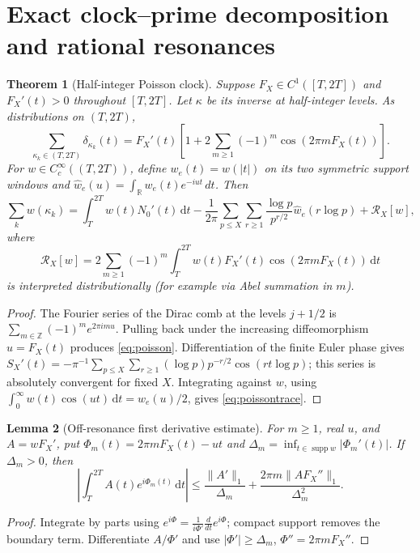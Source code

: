 \documentclass[11pt,a4paper]{article}
\numberwithin{equation}{section}
\newtheorem{theorem}{Theorem}[section]
\newtheorem{lemma}[theorem]{Lemma}
\newcommand{\R}{\mathbb R}
\newcommand{\dd}{\,\mathrm d}
\newcommand{\supp}{\operatorname{supp}}
\begin{document}
\section{Exact clock--prime decomposition and rational resonances}
\begin{theorem}[Half-integer Poisson clock]\label{thm:poisson}
Suppose $F_X\in C^1([T,2T])$ and $F_X'(t)>0$ throughout $[T,2T]$. Let $\kappa$ be its inverse at half-integer levels. As distributions on $(T,2T)$,
\begin{equation}\label{eq:poisson}
\sum_{\kappa_k\in(T,2T)}\delta_{\kappa_k}(t)
=F_X'(t)\left[1+2\sum_{m\ge1}(-1)^m\cos(2\pi mF_X(t))\right].
\end{equation}
For $w\in C_c^\infty((T,2T))$, define $w_e(t)=w(|t|)$ on its two symmetric support windows and $\widehat w_e(u)=\int_\R w_e(t)e^{-iut}\,dt$. Then
\begin{equation}\label{eq:poissontrace}
\sum_k w(\kappa_k)=\int_T^{2T}w(t)N_0'(t)\dd t
-\frac1{2\pi}\sum_{p\le X}\sum_{r\ge1}\frac{\log p}{p^{r/2}}\widehat w_e(r\log p)
+\mathcal R_X[w],
\end{equation}
where
\begin{equation}\label{eq:remainder}
\mathcal R_X[w]=2\sum_{m\ge1}(-1)^m\int_T^{2T}w(t)F_X'(t)\cos(2\pi mF_X(t))\dd t
\end{equation}
is interpreted distributionally (for example via Abel summation in $m$).
\end{theorem}
\begin{proof}
The Fourier series of the Dirac comb at the levels $j+1/2$ is $\sum_{m\in\mathbb Z}(-1)^m e^{2\pi i m u}$. Pulling back under the increasing diffeomorphism $u=F_X(t)$ produces \eqref{eq:poisson}. Differentiation of the finite Euler phase gives
$S_X'(t)=-\pi^{-1}\sum_{p\le X}\sum_{r\ge1}(\log p)p^{-r/2}\cos(rt\log p)$;
this series is absolutely convergent for fixed $X$. Integrating against $w$, using $\int_0^\infty w(t)\cos(ut)\dd t=\widehat w_e(u)/2$, gives \eqref{eq:poissontrace}.
\end{proof}
\begin{lemma}[Off-resonance first derivative estimate]\label{lem:ibp}
For $m\ge1$, real $u$, and $A=wF_X'$, put
$\Phi_m(t)=2\pi mF_X(t)-ut$ and
$\Delta_m=\inf_{t\in\supp w}|\Phi_m'(t)|$. If $\Delta_m>0$, then
\begin{equation}\label{eq:ibp}
\left|\int_T^{2T} A(t)e^{i\Phi_m(t)}\dd t\right|
\le\frac{\|A'\|_1}{\Delta_m}
+\frac{2\pi m\|AF_X''\|_1}{\Delta_m^2}.
\end{equation}
\end{lemma}
\begin{proof}
Integrate by parts using $e^{i\Phi}=\frac1{i\Phi'}\frac{d}{dt}e^{i\Phi}$; compact support removes the boundary term. Differentiate $A/\Phi'$ and use $|\Phi'|\ge\Delta_m$, $\Phi''=2\pi mF_X''$.
\end{proof}
\end{document}
